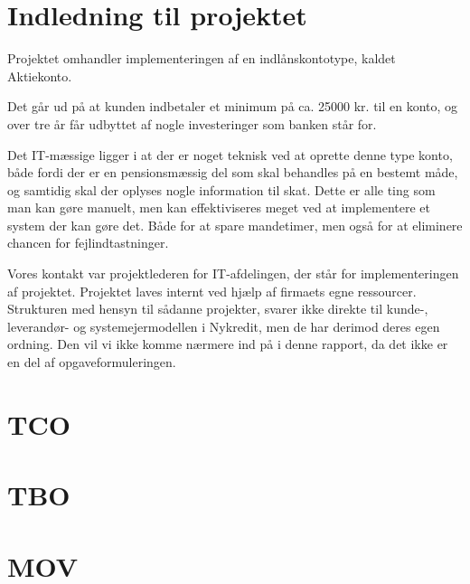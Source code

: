 \documentclass[12pt,a4paper,oneside]{article}
\begin{document}
\section{Indledning til projektet}
Projektet omhandler implementeringen af en indlånskontotype, kaldet Aktiekonto.

Det går ud på at kunden indbetaler et minimum på ca. 25000 kr. til en konto, og
over tre år får udbyttet af nogle investeringer som banken står for.

Det IT-mæssige ligger i at der er noget teknisk ved at oprette denne type konto,
både fordi der er en pensionsmæssig del som skal behandles på en bestemt måde, og
samtidig skal der oplyses nogle information til skat. Dette er alle ting som man
kan gøre manuelt, men kan effektiviseres meget ved at implementere et system der
kan gøre det. Både for at spare mandetimer, men også for at eliminere chancen
for fejlindtastninger.

Vores kontakt var projektlederen for IT-afdelingen, der står for
implementeringen af projektet. Projektet laves internt ved hjælp af firmaets
egne ressourcer. Strukturen med hensyn til sådanne projekter, svarer
ikke direkte til kunde-, leverandør- og systemejermodellen i Nykredit, men de
har derimod deres egen ordning. Den vil vi ikke komme nærmere ind på i denne
rapport, da det ikke er en del af opgaveformuleringen.

\section{TCO}


\section{TBO}


\section{MOV}

\end{document}
